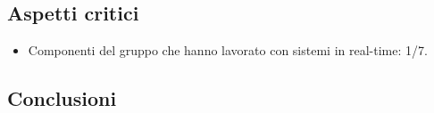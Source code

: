 \subsection{Aspetti critici}
\begin{itemize}
\item Componenti del gruppo che hanno lavorato con sistemi in real-time: 1/7.
\end{itemize}

\subsection{Conclusioni}
